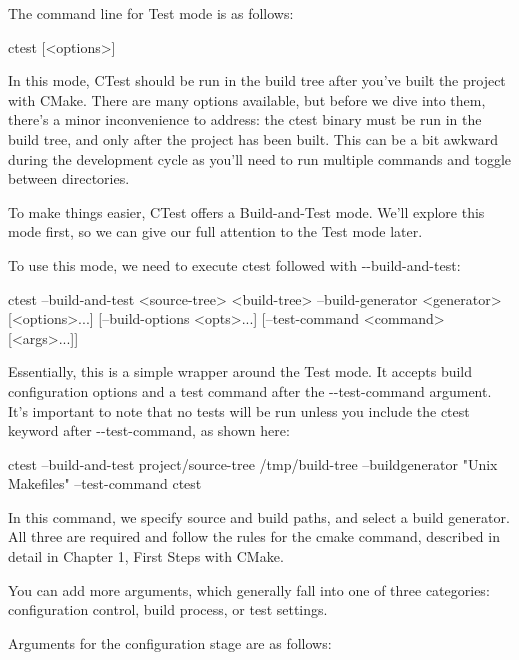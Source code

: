 The command line for Test mode is as follows:

\begin{shell}
ctest [<options>]
\end{shell}

In this mode, CTest should be run in the build tree after you’ve built the project with CMake. There are many options available, but before we dive into them, there’s a minor inconvenience to address: the ctest binary must be run in the build tree, and only after the project has been built. This can be a bit awkward during the development cycle as you’ll need to run multiple commands and toggle between directories.

To make things easier, CTest offers a Build-and-Test mode. We’ll explore this mode first, so we can give our full attention to the Test mode later.


To use this mode, we need to execute ctest followed with -{}-build-and-test:

\begin{shell}
ctest --build-and-test <source-tree> <build-tree>
      --build-generator <generator> [<options>...]
      [--build-options <opts>...]
      [--test-command <command> [<args>...]]
\end{shell}

Essentially, this is a simple wrapper around the Test mode. It accepts build configuration options and a test command after the -{}-test-command argument. It’s important to note that no tests will be run unless you include the ctest keyword after -{}-test-command, as shown here:

\begin{shell}
ctest --build-and-test project/source-tree /tmp/build-tree --buildgenerator "Unix Makefiles" --test-command ctest
\end{shell}

In this command, we specify source and build paths, and select a build generator. All three are required and follow the rules for the cmake command, described in detail in Chapter 1, First Steps with CMake.

You can add more arguments, which generally fall into one of three categories: configuration control, build process, or test settings.

Arguments for the configuration stage are as follows:

